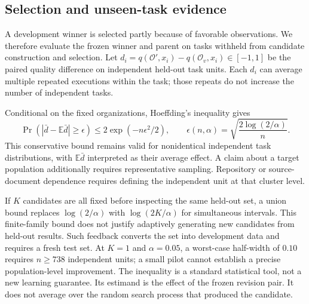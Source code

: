 \subsection{Selection and unseen-task evidence}
A development winner is selected partly because of favorable observations. We therefore evaluate the frozen winner and parent on tasks withheld from candidate construction and selection. Let $d_i=q(\mathcal O',x_i)-q(\mathcal O_v,x_i)\in[-1,1]$ be the paired quality difference on independent held-out task units. Each $d_i$ can average multiple repeated executions within the task; those repeats do not increase the number of independent tasks.

Conditional on the fixed organizations, Hoeffding's inequality gives \citep{hoeffding}
\begin{equation}
\Pr\!\left(\left|\bar d-\mathbb E\bar d\right|\geq\epsilon\right)
\leq 2\exp(-n\epsilon^2/2),\qquad
\epsilon(n,\alpha)=\sqrt{\frac{2\log(2/\alpha)}{n}}.
\label{eq:bound}
\end{equation}
This conservative bound remains valid for nonidentical independent task distributions, with $\mathbb E\bar d$ interpreted as their average effect. A claim about a target population additionally requires representative sampling. Repository or source-document dependence requires defining the independent unit at that cluster level.

If $K$ candidates are all fixed before inspecting the same held-out set, a union bound replaces $\log(2/\alpha)$ with $\log(2K/\alpha)$ for simultaneous intervals. This finite-family bound does not justify adaptively generating new candidates from held-out results. Such feedback converts the set into development data and requires a fresh test set. At $K=1$ and $\alpha=0.05$, a worst-case half-width of $0.10$ requires $n\geq738$ independent units; a small pilot cannot establish a precise population-level improvement. The inequality is a standard statistical tool, not a new learning guarantee. Its estimand is the effect of the frozen revision pair. It does not average over the random search process that produced the candidate.
